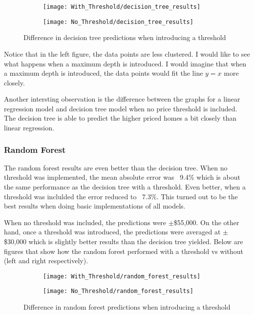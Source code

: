 \documentclass[12pt]{article}
\begin{document}
        \begin{figure}[H]
            \begin{subfigure}{0.5\textwidth}
                \centering
                \texttt{[image: With\_Threshold/decision\_tree\_results]}
            \end{subfigure}
            \hfill
            \begin{subfigure}{0.5\textwidth}
                \centering
                \texttt{[image: No\_Threshold/decision\_tree\_results]}
            \end{subfigure}
            \caption{Difference in decision tree predictions when introducing a threshold}
        \end{figure}

        Notice that in the left figure, the data points are less clustered. I would like to see what happens when a maximum depth is introduced. 
        I would imagine that when a maximum depth is introduced, the data points would fit the line $y = x$ more closely. 

        Another intersting observation is the difference between the graphs for a linear regression model and decision tree model when 
        no price threshold is included. The decision tree is able to predict the higher priced homes a bit closely than linear regression.

        \subsubsection{Random Forest}
        The random forest results are even better than the decision tree. When no threshold was implemented, the mean absolute error 
        was ~9.4\% which is about the same performance as the decision tree with a threshold. Even better, when a threshold was inclulded 
        the error reduced to ~7.3\%. This turned out to be the best results when doing basic implementations of all models. 

        When no threshold was included, the predictions were $\pm$\$55,000. On the other hand, once a threshold was introduced, the predictions 
        were averaged at $\pm$\$30,000 which is slightly better results than the decision tree yielded. Below are figures that show how the 
        random forest performed with a threshold vs without (left and right respectively).

        \begin{figure}[H]
            \begin{subfigure}{0.5\textwidth}
                \centering
                \texttt{[image: With\_Threshold/random\_forest\_results]}
            \end{subfigure}
            \hfill
            \begin{subfigure}{0.5\textwidth}
                \centering
                \texttt{[image: No\_Threshold/random\_forest\_results]}
            \end{subfigure}
            \caption{Difference in random forest predictions when introducing a threshold}
        \end{figure}
\end{document}
